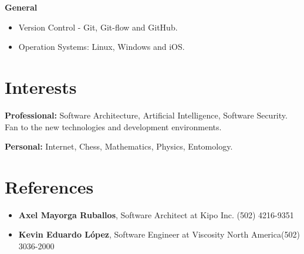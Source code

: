 \documentclass[]{friggeri-cv} %
\begin{document}
\textbf{General}
\begin{itemize}
	\item Version Control - Git, Git-flow and GitHub.
	\item Operation Systems: Linux, Windows and iOS.
\end{itemize}


\section{Interests}

\textbf{Professional:} Software Architecture, Artificial Intelligence, Software Security. Fan to the new technologies and development environments. 

\textbf{Personal:} Internet, Chess, Mathematics, Physics, Entomology.

\section{References}

\begin{itemize}
	\item \noindent \textbf{Axel Mayorga Ruballos},  Software Architect at Kipo Inc. \hfill \hfill (502) 4216-9351
	\item \noindent \textbf{Kevin Eduardo López}, Software Engineer at Viscosity North America\hfill \hfill (502) 3036-2000
\end{itemize}
\end{document}
